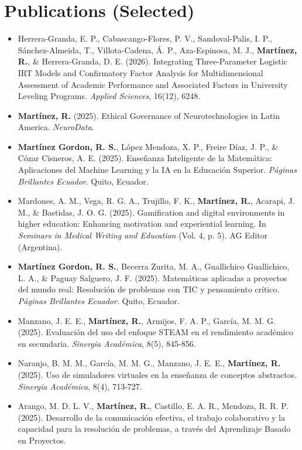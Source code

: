 \documentclass[11pt,a4paper]{article}
\begin{document}
\section*{Publications (Selected)}
\begin{itemize}
    \item Herrera-Granda, E. P., Cabascango-Flores, P. V., Sandoval-Palis, I. P., Sánchez-Almeida, T., Villota-Cadena, Á. P., Aza-Espinosa, M. J., \textbf{Martínez, R.}, \& Herrera-Granda, D. E. (2026). Integrating Three-Parameter Logistic IRT Models and Confirmatory Factor Analysis for Multidimensional Assessment of Academic Performance and Associated Factors in University Leveling Programs. \textit{Applied Sciences}, 16(12), 6248.
    \item \textbf{Martínez, R.} (2025). Ethical Governance of Neurotechnologies in Latin America. \textit{NeuroData}.
    \item \textbf{Martínez Gordon, R. S.}, López Mendoza, X. P., Freire Díaz, J. P., \& Cózar Cisneros, A. E. (2025). Enseñanza Inteligente de la Matemática: Aplicaciones del Machine Learning y la IA en la Educación Superior. \textit{Páginas Brillantes Ecuador}. Quito, Ecuador.
    \item Mardones, A. M., Vega, R. G. A., Trujillo, F. K., \textbf{Martínez, R.}, Acarapi, J. M., \& Bastidas, J. O. G. (2025). Gamification and digital environments in higher education: Enhancing motivation and experiential learning. In \textit{Seminars in Medical Writing and Education} (Vol. 4, p. 5). AG Editor (Argentina).
    \item \textbf{Martínez Gordon, R. S.}, Becerra Zurita, M. A., Guallichico Guallichico, L. A., \& Paguay Salguero, J. F. (2025). Matemáticas aplicadas a proyectos del mundo real: Resolución de problemas con TIC y pensamiento crítico. \textit{Páginas Brillantes Ecuador}. Quito, Ecuador.
    \item Manzano, J. E. E., \textbf{Martínez, R.}, Armijos, F. A. P., García, M. M. G. (2025). Evaluación del uso del enfoque STEAM en el rendimiento académico en secundaria. \textit{Sinergia Académica}, 8(5), 845-856.
    \item Naranjo, B. M. M., García, M. M. G., Manzano, J. E. E., \textbf{Martínez, R.} (2025). Uso de simuladores virtuales en la enseñanza de conceptos abstractos. \textit{Sinergia Académica}, 8(4), 713-727.
    \item Arango, M. D. L. V., \textbf{Martínez, R.}, Castillo, E. A. R., Mendoza, R. R. P. (2025). Desarrollo de la comunicación efectiva, el trabajo colaborativo y la capacidad para la resolución de problemas, a través del Aprendizaje Basado en Proyectos.

\end{itemize}
\end{document}
